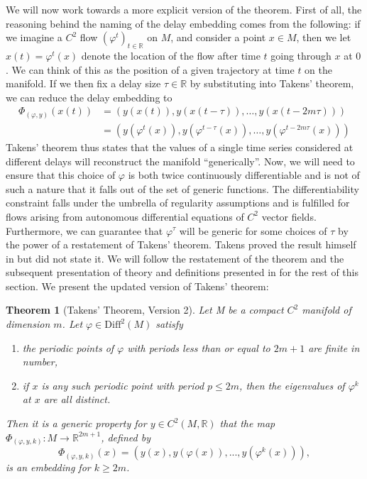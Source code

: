 \documentclass[11pt, a4paper]{memoir}
\theoremstyle{break}
\newtheorem{thm}{Theorem}
\theoremstyle{break}
\theoremstyle{nonumberplain}
\newcommand{\mR}{\mathbb{R}}
\begin{document}
We will now work towards a more explicit version of the theorem. First of all, the reasoning behind the naming of the delay embedding comes from the following: if we imagine a $C^2$ flow $(\varphi^t)_{t\in \mR}$ on $M$, and consider a point $x\in M$, then we let $x(t)=\varphi^t(x)$ denote the location of the flow after time $t$ going through $x$ at $0$. We can think of this as the position of a given trajectory at time $t$ on the manifold. If we then fix a delay size $\tau\in \mR$ by substituting into Takens' theorem, we can reduce the delay embedding to
\begin{align*}
\Phi_{(\varphi,y)}(x(t))&=\left(y(x(t)),y(x(t-\tau)),\ldots,y(x(t-2m\tau))\right)\\
&=\left(y(\varphi^t(x)),y(\varphi^{t-\tau}(x)),\ldots,y(\varphi^{t-2m\tau}(x))\right)
\end{align*}
Takens' theorem thus states that the values of a single time series considered at different delays will reconstruct the manifold \enquote{generically}. Now, we will need to ensure that this choice of $\varphi$ is both twice continuously differentiable and is not of such a nature that it falls out of the set of generic functions. The differentiability constraint falls under the umbrella of regularity assumptions and is fulfilled for flows arising from autonomous differential equations of $C^2$ vector fields. Furthermore, we can guarantee that $\varphi^\tau$ will be generic for some choices of $\tau$ by the power of a restatement of Takens' theorem. Takens proved the result himself in \cite{Takens} but did not state it. We will follow the restatement of the theorem and the subsequent presentation of theory and definitions presented in \cite{Huke} for the rest of this section. We present the updated version of Takens' theorem:
\begin{thm}[Takens' Theorem, Version 2]\label{v2}
Let M be a compact $C^2$ manifold of dimension $m$. Let $\varphi\in\text{Diff}^2(M)$ satisfy
\begin{enumerate}[label=\arabic*)]
	\item the periodic points of $\varphi$ with periods less than or equal to $2m+1$ are finite in number,
	\item if $x$ is any such periodic point with period $p\leqslant 2m$, then the eigenvalues of $\varphi^k$ at $x$ are all distinct.
\end{enumerate}
 Then it is a generic property for $y\in C^2(M,\mR)$ that the map $\Phi_{(\varphi,y,k)}:M\to \mathbb{R}^{2m+1}$, defined by
\begin{equation}\label{delayemb}
\Phi_{(\varphi,y,k)}(x)=(y(x),y(\varphi(x)),...,y(\varphi^{k}(x))),
\end{equation}
is an embedding for $k\geqslant 2m$. \cite{Huke}
\end{thm}
\end{document}
